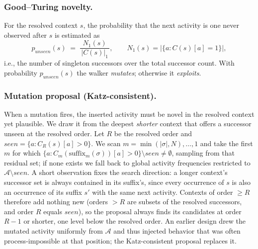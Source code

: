 \documentclass[runningheads]{llncs}
\newcommand{\chg}[1]{\textcolor{chgblue}{#1}}
\newcommand{\punseen}{\ensuremath{p_{\mathit{unseen}}}}
\begin{document}
\subsubsection{Good--Turing novelty.}
For the resolved context $s$, the probability that the next activity is one never observed after $s$ is estimated as
\begin{equation}
\punseen(s) \;=\; \frac{N_1(s)}{\,|C(s)|_1\,}, \qquad N_1(s) = |\{a : C(s)[a]=1\}|,
\label{eq:gt}
\end{equation}
i.e., the number of singleton successors over the total successor count. With probability $\punseen(s)$ the walker \emph{mutates}; otherwise it \emph{exploits}.

\subsubsection{Mutation proposal (Katz-consistent).}
When a mutation fires, the inserted activity must be novel in the resolved context yet plausible. We draw it from the deepest \emph{shorter} context that offers a successor unseen at the resolved order. Let $R$ be the resolved order and $\mathit{seen}=\{a:C_R(s)[a]>0\}$. We scan $m=\min(|\sigma|,N),\dots,1$ and take the first $m$ for which $\{a:C_m(\mathrm{suffix}_m(\sigma))[a]>0\}\setminus\mathit{seen}\neq\emptyset$, sampling from that residual set; if none exists we fall back to global activity frequencies restricted to $\mathcal{A}\setminus\mathit{seen}$. A short observation fixes the search direction: a longer context's successor set is always contained in its suffix's, since every occurrence of $s$ is also an occurrence of its suffix $s'$ with the same next activity. Contexts of order $\ge R$ therefore add nothing new (orders $>R$ are subsets of the resolved successors, and order $R$ equals $\mathit{seen}$), so the proposal always finds its candidates at order $R{-}1$ or shorter, one level below the resolved order. \chg{An earlier design drew the mutated activity uniformly from $\mathcal{A}$ and thus injected behavior that was often process-impossible at that position; the Katz-consistent proposal replaces it.}
\end{document}

